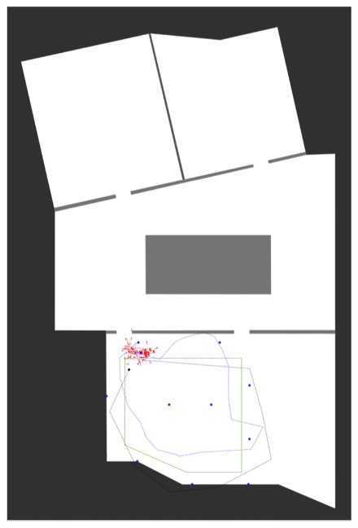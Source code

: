 \begin{figure}
{		\includegraphics[height=0.45\textheight]{figures/eval_1_1}
		\label{fig:exp1_img_1}
	}
	

\end{figure}
